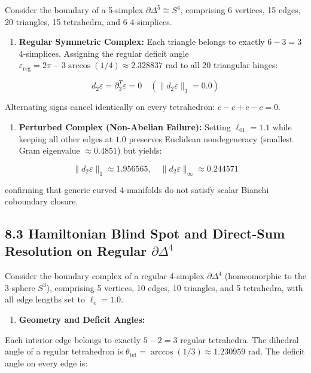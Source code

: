\documentclass[11pt]{article}
\begin{document}
Consider the boundary of a 5-simplex $\partial \Delta^5 \cong S^4$, comprising 6 vertices, 15 edges, 20 triangles, 15 tetrahedra, and 6 4-simplices.

\begin{enumerate}[leftmargin=1.4em,itemsep=0.2em]
\item \textbf{Regular Symmetric Complex:} Each triangle belongs to exactly $6 - 3 = 3$ 4-simplices. Assigning the regular deficit angle $\varepsilon_{\mathrm{reg}} = 2\pi - 3\arccos(1/4) \approx 2.328837$ rad to all 20 triangular hinges:
\end{enumerate}
\begin{equation*}
   d_2 \varepsilon = \partial_3^T \varepsilon = 0 \quad (\|d_2 \varepsilon\|_1 = 0.0)
\end{equation*}

Alternating signs cancel identically on every tetrahedron: $c - c + c - c = 0$.

\begin{enumerate}[leftmargin=1.4em,itemsep=0.2em]
\item \textbf{Perturbed Complex (Non-Abelian Failure):} Setting $\ell_{01} = 1.1$ while keeping all other edges at $1.0$ preserves Euclidean nondegeneracy (smallest Gram eigenvalue $\approx 0.4851$) but yields:
\end{enumerate}
\begin{equation*}
   \|d_2 \varepsilon\|_1 \approx 1.956565, \quad \|d_2 \varepsilon\|_\infty \approx 0.244571
\end{equation*}

confirming that generic curved 4-manifolds do not satisfy scalar Bianchi coboundary closure.

\subsection{\texorpdfstring{8.3 Hamiltonian Blind Spot and Direct-Sum Resolution on Regular $\partial\Delta^4$}{8.3 Hamiltonian Blind Spot and Direct-Sum Resolution on Regular ∂Δ⁴}}

Consider the boundary complex of a regular 4-simplex $\partial\Delta^4$ (homeomorphic to the 3-sphere $S^3$), comprising 5 vertices, 10 edges, 10 triangles, and 5 tetrahedra, with all edge lengths set to $\ell_e = 1.0$.

\begin{enumerate}[leftmargin=1.4em,itemsep=0.2em]
\item \textbf{Geometry and Deficit Angles:}
\end{enumerate}
Each interior edge belongs to exactly $5 - 2 = 3$ regular tetrahedra. The dihedral angle of a regular tetrahedron is $\theta_{\mathrm{tet}} = \arccos(1/3) \approx 1.230959$ rad. The deficit angle on every edge is:
\end{document}
